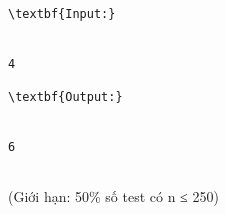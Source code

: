 \begin{verbatim}
\textbf{Input:}


4

\textbf{Output:}


6


\end{verbatim}

   (Giới hạn: 50\% số test có n ≤ 250)
